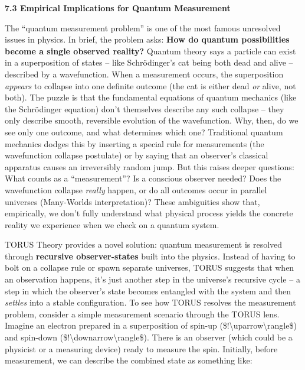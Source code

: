 \documentclass[
]{article}
\begin{document}
{\textbf{7.3 Empirical Implications for Quantum Measurement}

The ``quantum measurement problem'' is one of the most famous unresolved
issues in physics. In brief, the problem asks: \textbf{How do quantum
possibilities become a single observed reality?} Quantum theory says a
particle can exist in a superposition of states -- like Schrödinger's
cat being both dead and alive -- described by a wavefunction. When a
measurement occurs, the superposition \emph{appears} to collapse into
one definite outcome (the cat is either dead \emph{or} alive, not both).
The puzzle is that the fundamental equations of quantum mechanics (like
the Schrödinger equation) don't themselves describe any such collapse --
they only describe smooth, reversible evolution of the wavefunction.
Why, then, do we see only one outcome, and what determines which one?
Traditional quantum mechanics dodges this by inserting a special rule
for measurements (the wavefunction collapse postulate) or by saying that
an observer's classical apparatus causes an irreversibly random jump.
But this raises deeper questions: What counts as a ``measurement''? Is a
conscious observer needed? Does the wavefunction collapse \emph{really}
happen, or do all outcomes occur in parallel universes (Many-Worlds
interpretation)? These ambiguities show that, empirically, we don't
fully understand what physical process yields the concrete reality we
experience when we check on a quantum system.

TORUS Theory provides a novel solution: quantum measurement is resolved
through \textbf{recursive observer-states} built into the physics.
Instead of having to bolt on a collapse rule or spawn separate
universes, TORUS suggests that when an observation happens, it's just
another step in the universe's recursive cycle -- a step in which the
observer's state becomes entangled with the system and then
\emph{settles} into a stable configuration. To see how TORUS resolves
the measurement problem, consider a simple measurement scenario through
the TORUS lens. Imagine an electron prepared in a superposition of
spin-up (\$\textbar!\textbackslash uparrow\textbackslash rangle\$) and
spin-down (\$\textbar!\textbackslash downarrow\textbackslash rangle\$).
There is an observer (which could be a physicist or a measuring device)
ready to measure the spin. Initially, before measurement, we can
describe the combined state as something like:

}
\end{document}
